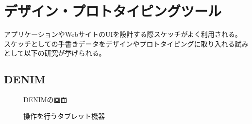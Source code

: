 \section{デザイン・プロトタイピングツール}
アプリケーションやWebサイトのUIを設計する際スケッチがよく利用される\cite{Newman2000SitemapsSA}。
スケッチとしての手書きデータをデザインやプロトタイピングに取り入れる試みとして以下の研究が挙げられる。

\subsection{DENIM}

\begin{figure}[H] \begin{minipage}{0.5\hsize}
                         \begin{center} 
                         \end{center} \caption{DENIMの画面} \label{fig:denim1}
\end{minipage} \begin{minipage}{0.5\hsize}
                   \begin{center} 
                   \end{center} \caption{操作を行うタブレット機器} \label{fig:denim2}
\end{minipage}
\end{figure}

